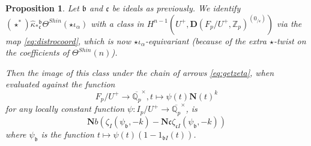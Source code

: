 \documentclass[10pt]{amsart}
\newtheorem{prop}[thm]{Proposition}
\theoremstyle{definition}
\newcommand{\Z}{\mathbb{Z}}
\newcommand{\Q}{\mathbb{Q}}
\renewcommand{\c}{\mathfrak{c}}
\renewcommand{\b}{\mathfrak{b}}
\newcommand{\D}{\mathbf{D}}
\numberwithin{equation}{section}
\begin{document}
    \begin{prop} \label{prop:stabshin}
        Let $\b$ and $\c$ be ideals as previously. We identify $(\star^*)\widehat{\kappa}_*{}^\b_\c\Theta^{Shin}(\star \iota_\alpha)$ with a class in $H^{n-1}(U^+, \D(F_p/U^+, \Z_p)^{(0_{/\c})})$ via the map \eqref{eq:distrocoord}, which is now $\star \iota_\alpha$-equivariant (because of the extra $\star$-twist on the coefficients of $\Theta^{Shin}(n)$).
        
        Then the image of this class under the chain of arrows \eqref{eq:getzeta}, when evaluated against the function
        \[
            F_p/U^+\to \overline{\Q_p}^\times, t\mapsto  \psi(t)\mathbf{N}(t)^k
        \]
        for any locally constant function $\psi: I_p/U^+ \to \overline{\Q_p}^\times$, is
        \[
        \mathbf{N}b(\zeta_I(\psi_\b, -k) - \mathbf{N}\c\zeta_{\c I}(\psi_\b, -k))
        \]
        where $\psi_\b$ is the function $t\mapsto \psi(t) (1-1_{\b I}(t))$. 
    \end{prop}
\end{document}
